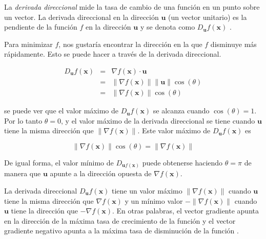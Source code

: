 \begin{remark}
La \textit{derivada direccional} mide  la tasa de cambio de una función
en un punto sobre un vector. 
La derivada direccional en la dirección $\mathbf{u}$ (un vector
unitario) es la pendiente de la función $f$ en la dirección $\mathbf{u}$ y se denota como $D_\mathbf{u}f(\mathbf{x})$ \cite{iangoodfellowyoshuabengioaaroncourville2017}.
\end{remark}

Para minimizar $f$, nos gustaría encontrar la dirección en la que $f$ disminuye
más rápidamente. Esto se puede hacer a través de la derivada direccional.

\[
\begin{array}{rcl}
            D_\mathbf{u}f(\mathbf{x}) & = & \nabla f(\mathbf{x}) \cdot \mathbf{u}\\
           & = & \|\nabla f(\mathbf{x})\| \|\mathbf{u}\| \cos({\theta})\\
           & = & \|\nabla f(\mathbf{x})\| \cos({\theta})
   \end{array}
\]

se puede ver que el valor máximo de $D_\mathbf{u}f(\mathbf{x})$
se alcanza cuando $\cos({\theta}) = 1$. Por lo tanto $\theta = 0$, y
el valor máximo de la derivada direccional se tiene cuando $\mathbf{u}$
tiene la misma dirección que $\|\nabla f(\mathbf{x})\|$. Este valor
máximo de $D_\mathbf{u}f(\mathbf{x})$ es

\[
\|\nabla f(\mathbf{x})\| \cos({\theta}) = \|\nabla f(\mathbf{x})\| 
\]

De igual forma, el valor mínimo de $D_{\mathbf{u}f(\mathbf{x})}$ puede obtenerse haciendo $\theta  = \pi$ de manera que 
$\mathbf{u}$ apunte a la dirección opuesta de $\nabla f(\mathbf{x})$.\\


\begin{remark}
La derivada direccional $D_\mathbf{u}f(\mathbf{x})$ tiene un valor
máximo $\|\nabla f (\mathbf{\mathbf{x}})\|$
cuando $\mathbf{u}$ tiene la misma dirección que $ \nabla f (\mathbf{x})$ y un mínimo valor $-\|\nabla f (\mathbf{\mathbf{x}})\|$ cuando $\mathbf{u}$ tiene la dirección que $-\nabla f (\mathbf{\mathbf{x}})$. En otras palabras, el vector
gradiente apunta en la dirección de la máxima tasa de crecimiento de la función
y el vector gradiente negativo apunta a la máxima tasa de disminución de la 
función \cite{acourseinmultivariablecalculusanalysis2010}.\\
\end{remark}

